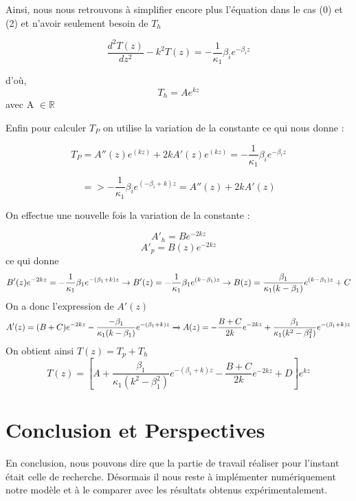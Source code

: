 \documentclass{rapportECC}
\begin{document}
Ainsi, nous nous retrouvons à simplifier encore plus l'équation dans le cas (0) et (2) et n'avoir seulement besoin de $T_h$

\begin{equation*}
    \frac{d^2 T(z)}{d z^2} - k^2 T(z) = - \frac{1}{\kappa_1}\beta_i e^{-\beta_iz}
\end{equation*}

d'où,
\begin{equation}
    T_h = A e^{kz} 
\end{equation}
avec A $\in \mathbb{R}$

Enfin pour calculer $T_P$ on utilise la variation de la constante ce qui nous donne :

\begin{equation*}
            T_P = A''(z)e^{(kz)} + 2k A'(z)e^{(kz)} = - \frac{1}{\kappa_1}\beta_i e^{-\beta_iz} 
\end{equation*}

\begin{equation*}
            => - \frac{1}{\kappa_1}\beta_i e^{(-\beta_i + k)z} = A''(z) + 2k A'(z)
\end{equation*}

On effectue une nouvelle fois la variation de la constante :

\begin{equation*}
    A'_h = B e^{-2kz}
\end{equation*}
\begin{equation*}
    A'_p = B(z) e^{-2kz}
\end{equation*}
ce qui donne
\begin{equation*}
   B'(z)e^{-2kz} = -\frac{1}{\kappa_1}\beta_1 e^{-(\beta_1+k)z}\\
   \xrightarrow{} B'(z) = -\frac{1}{\kappa_1}\beta_1 e^{(k-\beta_1)z}
   \xrightarrow{} B(z) = \frac{\beta_1}{\kappa_1(k-\beta_1)}e^{(k-\beta_1)z} + C
\end{equation*}
On a donc l'expression de $A'(z)$
\begin{equation*}
   A'(z)=(B+C)e^{-2kz} -\frac{-\beta_1}{\kappa_1(k-\beta_1)} e^{-(\beta_1+k)z}\\
   \xrightarrow{} A(z) = -\frac{B+C}{2k}e^{-2kz}+\frac{\beta_1}{\kappa_1(k^2-\beta_1^2)} e^{-(\beta_1+k)z}
\end{equation*}
On obtient ainsi $T(z) = T_p + T_h$
\begin{equation}
            T(z) = \left[A+\frac{\beta_1}{\kappa_1(k^2-\beta_1^2)}e^{-(\beta_1+k)z}-\frac{B+C}{2k}e^{-2kz}+D\right]e^{kz} 
\end{equation}


\section{Conclusion et Perspectives}

En conclusion, nous pouvons dire que la partie de travail réaliser pour l’instant était celle de recherche. Désormais il nous reste à implémenter numériquement notre modèle et à le comparer avec les résultats obtenus expérimentalement.

\newpage


\printbibliography
\end{document}
